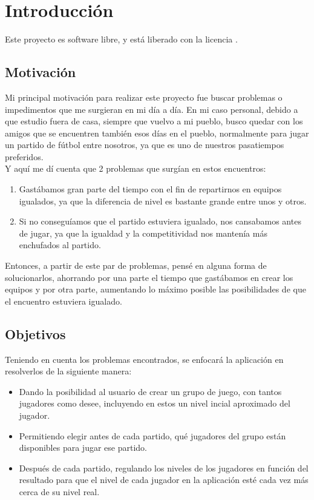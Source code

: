 \chapter{Introducción}

Este proyecto es software libre, y está liberado con la licencia \cite{gplv3}.

\section{Motivación}

Mi principal motivación para realizar este proyecto fue buscar problemas o impedimentos que me surgieran en mi día a día.
En mi caso personal, debido a que estudio fuera de casa, siempre que vuelvo a mi pueblo, busco quedar con los amigos que se encuentren también esos días en el pueblo, 
normalmente para jugar un partido de fútbol entre nosotros, ya que es uno de nuestros pasatiempos preferidos.\\

Y aquí me dí cuenta que 2 problemas que surgían en estos encuentros:
\begin{enumerate}
    \item Gastábamos gran parte del tiempo con el fin de repartirnos en equipos igualados, ya que la diferencia de nivel es bastante grande entre unos y otros.
    \item Si no conseguíamos que el partido estuviera igualado, nos cansabamos antes de jugar, ya que la igualdad y la competitividad nos mantenía más enchufados al partido.
\end{enumerate}

Entonces, a partir de este par de problemas, pensé en alguna forma de solucionarlos, ahorrando por una parte el tiempo que gastábamos en crear los equipos y por otra parte,
aumentando lo máximo posible las posibilidades de que el encuentro estuviera igualado.

\newpage

\section{Objetivos}

Teniendo en cuenta los problemas encontrados, se enfocará la aplicación en resolverlos de la siguiente manera:
\begin{itemize}
    \item Dando la posibilidad al usuario de crear un grupo de juego, con tantos jugadores como desee, incluyendo en estos un nivel incial aproximado del jugador.
    \item Permitiendo elegir antes de cada partido, qué jugadores del grupo están disponibles para jugar ese partido.
    \item Después de cada partido, regulando los niveles de los jugadores en función del resultado para que el nivel de cada jugador en la aplicación esté cada vez más cerca de su nivel real.
\end{itemize}